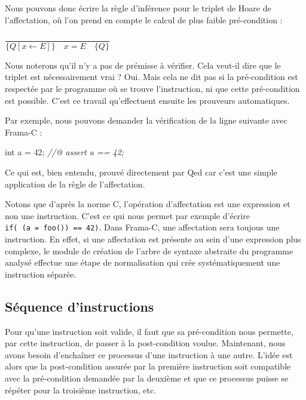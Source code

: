 \documentclass[12pt,francais,]{scrbook}
\newenvironment{Shaded}{}{}
\newcommand{\DataTypeTok}[1]{\textcolor[rgb]{0.56,0.13,0.00}{{#1}}}
\newcommand{\DecValTok}[1]{\textcolor[rgb]{0.25,0.63,0.44}{{#1}}}
\newcommand{\CommentTok}[1]{\textcolor[rgb]{0.38,0.63,0.69}{\textit{{#1}}}}
\newcommand{\NormalTok}[1]{{#1}}
\newenvironment{zdsblock}[1]{%
  \tcolorbox[beamer,%
    noparskip,breakable,
    colback=LightBlue,colframe=DarkBlue,%
    colbacklower=DarkBlue,%
    title=#1]
}{\endtcolorbox}
\begin{document}
Nous pouvons donc écrire la règle d'inférence pour le triplet de Hoare
de l'affectation, où l'on prend en compte le calcul de plus faible
pré-condition :

\begin{center}
\(\dfrac{}{\{Q[x \leftarrow E] \}\quad x = E \quad\{ Q \}}\)
\end{center}

Nous noterons qu'il n'y a pas de prémisse à vérifier. Cela veut-il dire
que le triplet est nécessairement vrai ? Oui. Mais cela ne dit pas si la
pré-condition est respectée par le programme où se trouve l'instruction,
ni que cette pré-condition est possible. C'est ce travail qu'effectuent
ensuite les prouveurs automatiques.

Par exemple, nous pouvons demander la vérification de la ligne suivante
avec Frama-C :

\begin{footnotesize}\begin{Shaded}
\begin{Highlighting}[]
\DataTypeTok{int} \NormalTok{a = }\DecValTok{42}\NormalTok{;}
\CommentTok{//@ assert a == 42;}
\end{Highlighting}
\end{Shaded}\end{footnotesize}

Ce qui est, bien entendu, prouvé directement par Qed car c'est une
simple application de la règle de l'affectation.

\begin{zdsblock}{Information}
  Notons que d'après la norme C,
  l'opération d'affectation est une expression et non une
  instruction. C'est ce qui nous permet par exemple d'écrire
  \texttt{if(\ (a\ =\ foo())\ ==\ 42)}. Dans Frama-C, une affectation sera
  toujous une instruction. En effet, si une affectation est
  présente au sein d'une expression plus complexe, le module de
  création de l'arbre de syntaxe abstraite du programme analysé
  effectue une étape de normalisation qui crée systématiquement
  une instruction séparée.
\end{zdsblock}

\subsection{Séquence d'instructions}\label{suxe9quence-dinstructions}

Pour qu'une instruction soit valide, il faut que sa pré-condition nous
permette, par cette instruction, de passer à la post-condition voulue.
Maintenant, nous avons besoin d'enchaîner ce processus d'une instruction
à une autre. L'idée est alors que la post-condition assurée par la
première instruction soit compatible avec la pré-condition demandée par
la deuxième et que ce processus puisse se répéter pour la troisième
instruction, etc.
\end{document}
